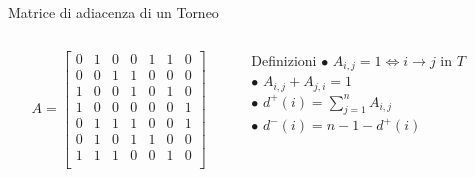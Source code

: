 \documentclass{beamer}
\begin{document}
\begin{frame}{Matrice di adiacenza di un Torneo}
	\begin{columns}
		\begin{column}{.5 \textwidth}
			\[
			A = \begin{bmatrix}
				0 & 1 & 0 & 0 & 1 & 1 & 0 \\
				0 & 0 & 1 & 1 & 0 & 0 & 0 \\
				1 & 0 & 0 & 1 & 0 & 1 & 0 \\
				1 & 0 & 0 & 0 & 0 & 0 & 1 \\
				0 & 1 & 1 & 1 & 0 & 0 & 1 \\
				0 & 1 & 0 & 1 & 1 & 0 & 0 \\
				1 & 1 & 1 & 0 & 0 & 1 & 0 \\
		    \end{bmatrix}
			\]
		\end{column}

		\begin{column}{.5 \textwidth}
			\begin{block}{Definizioni}
				\vspace{2mm}
				$\bullet$ $ A_{i,j} = 1 \iff i \longrightarrow j \text{ in } T $ \\
				\vspace{2mm}
				$\bullet$ $ A_{i,j} + A_{j, i} = 1 $ \\
				\vspace{2mm}
				$\bullet$ $ d^+(i) = \sum\limits_{j = 1}^n A_{i, j} $ \\
				\vspace{2mm}
				$\bullet$ $ d^-(i) = n - 1 - d^+(i) $ \\
				\vspace{2mm}
			\end{block}
		\end{column}
	\end{columns}
\end{frame}
\end{document}
